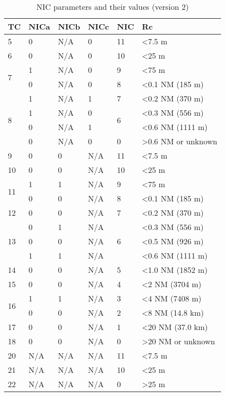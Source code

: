 \begin{table}[!ht]
\caption{NIC parameters and their values (version 2)}
\label{tb:nic-params-v2}
\begin{tabular}{|l|l|l|l|l|l|}
\hline
\textbf{TC} & \textbf{NICa} & \textbf{NICb} & \textbf{NICc} & \textbf{NIC} & \textbf{Rc} \\ \hline \hline
5 & 0 & N/A & 0 & 11 & \textless 7.5 m \\ \hline
6 & 0 & N/A & 0 & 10 & \textless 25 m \\ \hline
\multirow{2}{*}{7} & 1 & N/A & 0 & 9 & \textless 75 m \\ \cline{2-6}
 & 0 & N/A & 0 & 8 & \textless 0.1 NM (185 m) \\ \hline
\multirow{4}{*}{8} & 1 & N/A & 1 & 7 & \textless 0.2 NM (370 m) \\ \cline{2-6}
 & 1 & N/A & 0 & \multirow{2}{*}{6} & \textless 0.3 NM (556 m) \\ \cline{2-4} \cline{6-6}
 & 0 & N/A & 1 &  & \textless 0.6 NM (1111 m) \\ \cline{2-6}
 & 0 & N/A & 0 & 0 & \textgreater 0.6 NM or unknown \\ \hline
9 & 0 & 0 & N/A & 11 & \textless 7.5 m \\ \hline
10 & 0 & 0 & N/A & 10 & \textless 25 m \\ \hline
\multirow{2}{*}{11} & 1 & 1 & N/A & 9 & \textless 75 m \\ \cline{2-6}
 & 0 & 0 & N/A & 8 & \textless 0.1 NM (185 m) \\ \hline
12 & 0 & 0 & N/A & 7 & \textless 0.2 NM (370 m) \\ \hline
\multirow{3}{*}{13} & 0 & 1 & N/A & \multirow{3}{*}{6} & \textless 0.3 NM (556 m) \\ \cline{2-4} \cline{6-6}
 & 0 & 0 & N/A &  & \textless 0.5 NM (926 m) \\ \cline{2-4} \cline{6-6}
 & 1 & 1 & N/A &  & \textless 0.6 NM (1111 m) \\ \hline
14 & 0 & 0 & N/A & 5 & \textless 1.0 NM (1852 m) \\ \hline
15 & 0 & 0 & N/A & 4 & \textless 2 NM (3704 m) \\ \hline
\multirow{2}{*}{16} & 1 & 1 & N/A & 3 & \textless 4 NM (7408 m) \\ \cline{2-6}
 & 0 & 0 & N/A & 2 & \textless 8 NM (14.8 km) \\ \hline
17 & 0 & 0 & N/A & 1 & \textless 20 NM (37.0 km) \\ \hline
18 & 0 & 0 & N/A & 0 & \textgreater 20 NM or unknown \\ \hline
20 & N/A & N/A & N/A & 11 & \textless 7.5 m \\ \hline
21 & N/A & N/A & N/A & 10 & \textless 25 m \\ \hline
22 & N/A & N/A & N/A & 0 & \textgreater 25 m \\ \hline
\end{tabular}
\end{table}


